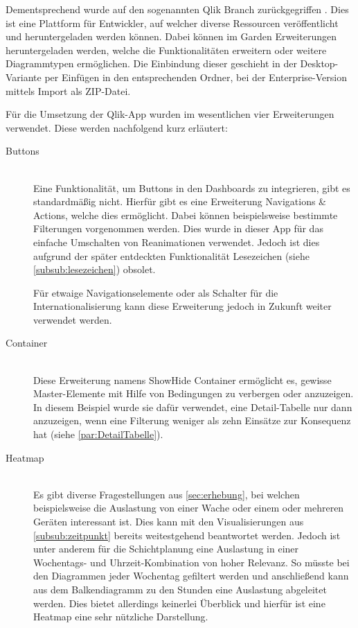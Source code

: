 Dementsprechend wurde auf den sogenannten \glqq Qlik Branch\grqq{} zurückgegriffen \cite{QlikTech.2019b}.
Dies ist eine Plattform für Entwickler, auf welcher diverse Ressourcen veröffentlicht und heruntergeladen werden können.
Dabei können im \glqq Garden\grqq{} Erweiterungen heruntergeladen werden, welche die Funktionalitäten erweitern oder weitere Diagrammtypen ermöglichen.
Die Einbindung dieser geschieht in der Desktop-Variante per Einfügen in den entsprechenden Ordner, bei der Enterprise-Version mittels Import als ZIP-Datei.

Für die Umsetzung der Qlik-App wurden im wesentlichen vier Erweiterungen verwendet.
Diese werden nachfolgend kurz erläutert:
\begin{description}
\item[Buttons] \hfill \\
Eine Funktionalität, um Buttons in den Dashboards zu integrieren, gibt es standardmäßig nicht.
Hierfür gibt es eine Erweiterung \glqq Navigations \& Actions\grqq{}, welche dies ermöglicht.
Dabei können beispielsweise bestimmte Filterungen vorgenommen werden.
Dies wurde in dieser App für das einfache Umschalten von Reanimationen verwendet.
Jedoch ist dies aufgrund der später entdeckten Funktionalität \glqq Lesezeichen\grqq{} (siehe \ref{subsub:lesezeichen}) obsolet.

Für etwaige Navigationselemente oder als Schalter für die Internationalisierung kann diese Erweiterung jedoch in Zukunft weiter verwendet werden.
\item[Container] \hfill \\
Diese Erweiterung namens \glqq ShowHide Container\grqq{} ermöglicht es, gewisse Master-Elemente mit Hilfe von Bedingungen zu verbergen oder anzuzeigen.
In diesem Beispiel wurde sie dafür verwendet, eine Detail-Tabelle nur dann anzuzeigen, wenn eine Filterung weniger als zehn Einsätze zur Konsequenz hat (siehe \ref{par:DetailTabelle}). 

\item[Heatmap] \hfill \\
Es gibt diverse Fragestellungen aus \ref{sec:erhebung}, bei welchen beispielsweise die Auslastung von einer Wache oder einem oder mehreren Geräten interessant ist.
Dies kann mit den Visualisierungen aus \ref{subsub:zeitpunkt} bereits weitestgehend beantwortet werden.
Jedoch ist unter anderem für die Schichtplanung eine Auslastung in einer Wochentags- und Uhrzeit-Kombination von hoher Relevanz.
So müsste bei den Diagrammen jeder Wochentag gefiltert werden und anschließend kann aus dem Balkendiagramm zu den Stunden eine Auslastung abgeleitet werden.
Dies bietet allerdings keinerlei Überblick und hierfür ist eine \glqq Heatmap\grqq{} eine sehr nützliche Darstellung.


\end{description}
